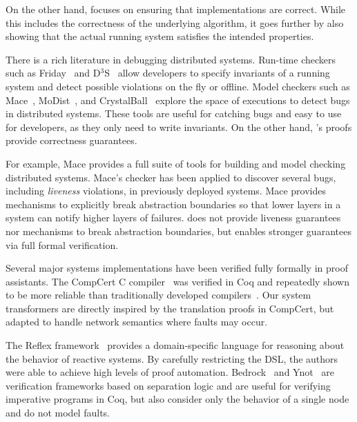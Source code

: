 On the other hand, \Verdi focuses on ensuring that implementations
are correct.  While this includes the correctness of the underlying
algorithm, it goes further by also showing that the actual running
system satisfies the intended properties.

 There is a rich literature in
debugging distributed systems.  Run-time checkers such as
Friday~\cite{geels:friday} and D$^3$S~\cite{liu:d3s} allow developers
to specify invariants of a running system and detect possible
violations on the fly or offline.  Model checkers such as
Mace~\cite{killian:mace, killian:macemc}, MoDist~\cite{yang:modist},
and CrystalBall~\cite{yabandeh:crystalball} explore the space of
executions to detect bugs in distributed systems.  These tools are
useful for catching bugs and easy to use for developers, as they only
need to write invariants.  On the other hand, \Verdi's proofs provide
correctness guarantees.

For example, Mace provides a full suite of tools for building and model
checking distributed systems.  Mace's checker has been applied to discover
several bugs, including \emph{liveness} violations, in previously deployed
systems. Mace provides mechanisms to explicitly break abstraction
boundaries so that lower layers in a system can notify higher layers of
failures.  \Verdi does not provide liveness guarantees nor mechanisms to
break abstraction boundaries, but enables stronger guarantees via full
formal verification.

 Several major systems implementations have been
verified fully formally in proof assistants.  The CompCert C
compiler~\cite{leroy:compcert} was verified in
Coq and repeatedly shown to be more reliable than traditionally
developed compilers~\cite{yang:csmith,vu:emi}. Our system transformers
are directly inspired by the translation proofs in CompCert, but
adapted to handle network semantics where faults may occur.

The Reflex framework~\cite{ricketts:reflex} provides a domain-specific
language for reasoning about the behavior of reactive systems.  By
carefully restricting the DSL, the authors were able to achieve high
levels of proof automation.  Bedrock~\cite{chlipala:bedrock} and
Ynot~\cite{nanevski:ynot} are verification frameworks based on
separation logic and are useful for verifying imperative programs in
Coq, but also consider only the behavior of a single node and do not
model faults.


